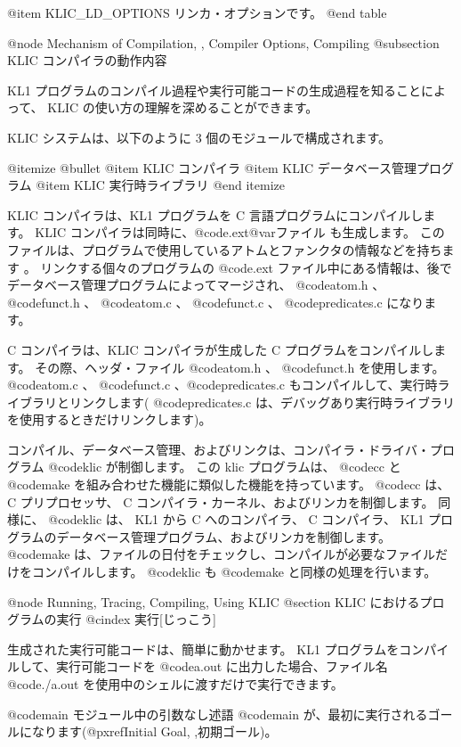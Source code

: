 {{{{@item KLIC_LD_OPTIONS
リンカ・オプションです。
@end table

@node Mechanism of Compilation,  , Compiler Options, Compiling
@subsection KLIC コンパイラの動作内容

KL1 プログラムのコンパイル過程や実行可能コードの生成過程を知ることによって、 KLIC の使い方の理解を深めることができます。

KLIC システムは、以下のように 3 個のモジュールで構成されます。

@itemize @bullet
@item
 KLIC コンパイラ
@item
 KLIC データベース管理プログラム
@item
 KLIC 実行時ライブラリ
@end itemize

KLIC コンパイラは、KL1 プログラムを C 言語プログラムにコンパイルします。
KLIC コンパイラは同時に、@code{.ext@var{ファイル}} も生成します。
このファイルは、プログラムで使用しているアトムとファンクタの情報などを持ちます 。
リンクする個々のプログラムの @code{.ext} ファイル中にある情報は、後でデータベース管理プログラムによってマージされ、 @code{atom.h} 、 @code{funct.h} 、 @code{atom.c} 、 @code{funct.c} 、 @code{predicates.c} になります。

 C コンパイラは、KLIC コンパイラが生成した C プログラムをコンパイルします。
その際、ヘッダ・ファイル @code{atom.h} 、 @code{funct.h} を使用します。
 @code{atom.c} 、 @code{funct.c} 、@code{predicates.c} もコンパイルして、実行時ライブラリとリンクします( @code{predicates.c} は、デバッグあり実行時ライブラリを使用するときだけリンクします)。

コンパイル、データベース管理、およびリンクは、コンパイラ・ドライバ・プログラム @code{klic} が制御します。
この klic プログラムは、 @code{cc} と @code{make} を組み合わせた機能に類似した機能を持っています。
 @code{cc} は、 C プリプロセッサ、 C コンパイラ・カーネル、およびリンカを制御します。
同様に、 @code{klic} は、 KL1 から C へのコンパイラ、 C コンパイラ、 KL1 プログラムのデータベース管理プログラム、およびリンカを制御します。
 @code{make} は、ファイルの日付をチェックし、コンパイルが必要なファイルだけをコンパイルします。
 @code{klic} も @code{make} と同様の処理を行います。

@node Running, Tracing, Compiling, Using KLIC
@section  KLIC におけるプログラムの実行
@cindex 実行[じっこう]

生成された実行可能コードは、簡単に動かせます。
 KL1 プログラムをコンパイルして、実行可能コードを @code{a.out} に出力した場合、ファイル名 @code{./a.out} を使用中のシェルに渡すだけで実行できます。

@code{main} モジュール中の引数なし述語 @code{main} が、最初に実行されるゴールになります(@pxref{Initial Goal, ,初期ゴール})。

}}}}
